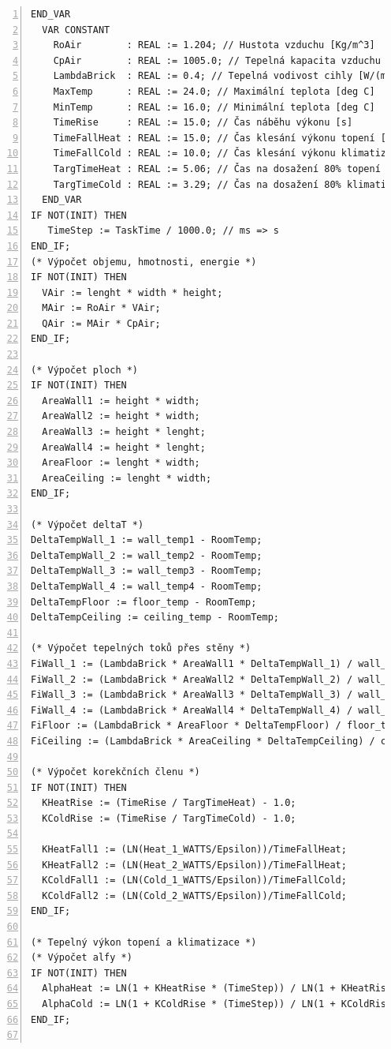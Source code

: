 \begin{lstlisting}[language=ST, breaklines=true, numbers=left, numberstyle=\small, numbersep=10pt, frame=single, basicstyle=\ttfamily\small, caption={Definice funkčního bloku fbRoomTempMod}, label={lst:fbRoomTempMod}]
  END_VAR
  VAR CONSTANT
    RoAir        : REAL := 1.204; // Hustota vzduchu [Kg/m^3]
    CpAir        : REAL := 1005.0; // Tepelná kapacita vzduchu [J/(kg*K)]
    LambdaBrick  : REAL := 0.4; // Tepelná vodivost cihly [W/(m*K)]
    MaxTemp      : REAL := 24.0; // Maximální teplota [deg C]
    MinTemp      : REAL := 16.0; // Minimální teplota [deg C]
    TimeRise     : REAL := 15.0; // Čas náběhu výkonu [s]
    TimeFallHeat : REAL := 15.0; // Čas klesání výkonu topení [s]
    TimeFallCold : REAL := 10.0; // Čas klesání výkonu klimatizace [s]
    TargTimeHeat : REAL := 5.06; // Čas na dosažení 80% topení [s]
    TargTimeCold : REAL := 3.29; // Čas na dosažení 80% klimatizace [s]
  END_VAR
IF NOT(INIT) THEN
   TimeStep := TaskTime / 1000.0; // ms => s
END_IF;
(* Výpočet objemu, hmotnosti, energie *)
IF NOT(INIT) THEN
  VAir := lenght * width * height;
  MAir := RoAir * VAir;
  QAir := MAir * CpAir;
END_IF;

(* Výpočet ploch *)
IF NOT(INIT) THEN
  AreaWall1 := height * width;
  AreaWall2 := height * width;
  AreaWall3 := height * lenght;
  AreaWall4 := height * lenght;
  AreaFloor := lenght * width;
  AreaCeiling := lenght * width;
END_IF;

(* Výpočet deltaT *)
DeltaTempWall_1 := wall_temp1 - RoomTemp;
DeltaTempWall_2 := wall_temp2 - RoomTemp;
DeltaTempWall_3 := wall_temp3 - RoomTemp;
DeltaTempWall_4 := wall_temp4 - RoomTemp;
DeltaTempFloor := floor_temp - RoomTemp;
DeltaTempCeiling := ceiling_temp - RoomTemp;

(* Výpočet tepelných toků přes stěny *)
FiWall_1 := (LambdaBrick * AreaWall1 * DeltaTempWall_1) / wall_thic1;
FiWall_2 := (LambdaBrick * AreaWall2 * DeltaTempWall_2) / wall_thic2;
FiWall_3 := (LambdaBrick * AreaWall3 * DeltaTempWall_3) / wall_thic3;
FiWall_4 := (LambdaBrick * AreaWall4 * DeltaTempWall_4) / wall_thic4;
FiFloor := (LambdaBrick * AreaFloor * DeltaTempFloor) / floor_thic;
FiCeiling := (LambdaBrick * AreaCeiling * DeltaTempCeiling) / ceiling_thic;

(* Výpočet korekčních členu *)
IF NOT(INIT) THEN
  KHeatRise := (TimeRise / TargTimeHeat) - 1.0;
  KColdRise := (TimeRise / TargTimeCold) - 1.0;

  KHeatFall1 := (LN(Heat_1_WATTS/Epsilon))/TimeFallHeat;
  KHeatFall2 := (LN(Heat_2_WATTS/Epsilon))/TimeFallHeat;
  KColdFall1 := (LN(Cold_1_WATTS/Epsilon))/TimeFallCold;
  KColdFall2 := (LN(Cold_2_WATTS/Epsilon))/TimeFallCold;
END_IF;

(* Tepelný výkon topení a klimatizace *)
(* Výpočet alfy *)
IF NOT(INIT) THEN
  AlphaHeat := LN(1 + KHeatRise * (TimeStep)) / LN(1 + KHeatRise * TimeRise);
  AlphaCold := LN(1 + KColdRise * (TimeStep)) / LN(1 + KColdRise * TimeRise);
END_IF;


\end{lstlisting}
